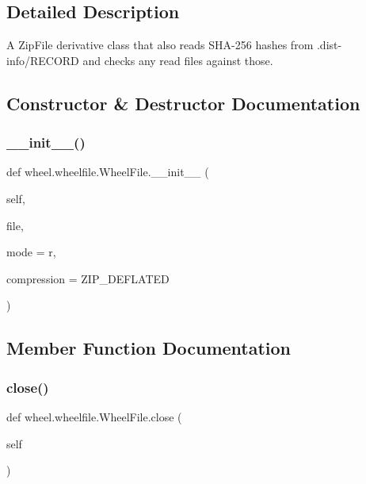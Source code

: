 \subsection{Detailed Description}
\begin{DoxyVerb}A ZipFile derivative class that also reads SHA-256 hashes from
.dist-info/RECORD and checks any read files against those.
\end{DoxyVerb}
 

\subsection{Constructor \& Destructor Documentation}
\mbox{\label{classwheel_1_1wheelfile_1_1WheelFile_a8be2bbd1569e6331ab1c87cb22b0d51d}} 
\subsubsection{\texorpdfstring{\+\_\+\+\_\+init\+\_\+\+\_\+()}{\_\_init\_\_()}}
{\footnotesize\ttfamily def wheel.\+wheelfile.\+Wheel\+File.\+\_\+\+\_\+init\+\_\+\+\_\+ (\begin{DoxyParamCaption}\item[{}]{self,  }\item[{}]{file,  }\item[{}]{mode = {\ttfamily \textquotesingle{}r\textquotesingle{}},  }\item[{}]{compression = {\ttfamily ZIP\+\_\+DEFLATED} }\end{DoxyParamCaption})}



\subsection{Member Function Documentation}
\mbox{\label{classwheel_1_1wheelfile_1_1WheelFile_a3678e0b5727d2cee940e57f75034014a}} 
\subsubsection{\texorpdfstring{close()}{close()}}
{\footnotesize\ttfamily def wheel.\+wheelfile.\+Wheel\+File.\+close (\begin{DoxyParamCaption}\item[{}]{self }\end{DoxyParamCaption})}

